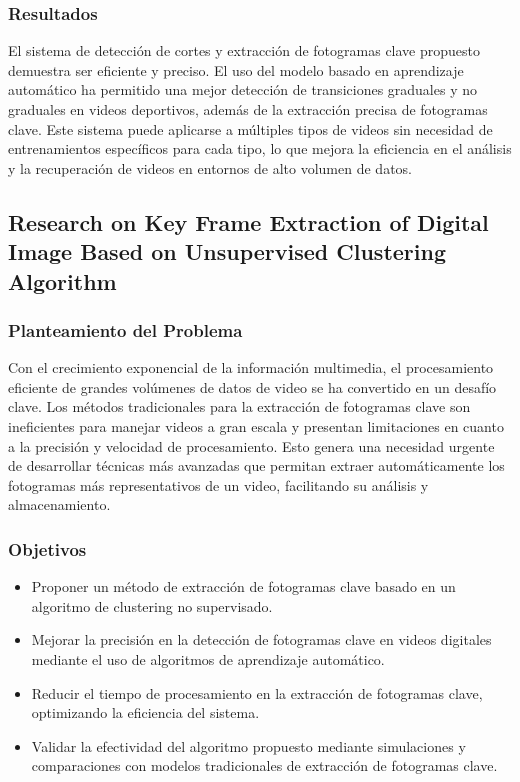 \subsubsection{Resultados}

El sistema de detección de cortes y extracción de fotogramas clave propuesto demuestra ser eficiente y preciso. El uso del modelo basado en aprendizaje automático ha permitido una mejor detección de transiciones graduales y no graduales en videos deportivos, además de la extracción precisa de fotogramas clave. Este sistema puede aplicarse a múltiples tipos de videos sin necesidad de entrenamientos específicos para cada tipo, lo que mejora la eficiencia en el análisis y la recuperación de videos en entornos de alto volumen de datos.


\subsection{Research on Key Frame Extraction of Digital Image Based on Unsupervised Clustering Algorithm}
\cite{wang2023keyframe}
\subsubsection{Planteamiento del Problema}
Con el crecimiento exponencial de la información multimedia, el procesamiento eficiente de grandes volúmenes de datos de video se ha convertido en un desafío clave. Los métodos tradicionales para la extracción de fotogramas clave son ineficientes para manejar videos a gran escala y presentan limitaciones en cuanto a la precisión y velocidad de procesamiento. Esto genera una necesidad urgente de desarrollar técnicas más avanzadas que permitan extraer automáticamente los fotogramas más representativos de un video, facilitando su análisis y almacenamiento.
\subsubsection{Objetivos}
\begin{itemize}
	\item Proponer un método de extracción de fotogramas clave basado en un algoritmo de clustering no supervisado.
	\item Mejorar la precisión en la detección de fotogramas clave en videos digitales mediante el uso de algoritmos de aprendizaje automático.
	\item Reducir el tiempo de procesamiento en la extracción de fotogramas clave, optimizando la eficiencia del sistema.
	\item Validar la efectividad del algoritmo propuesto mediante simulaciones y comparaciones con modelos tradicionales de extracción de fotogramas clave.
\end{itemize}
